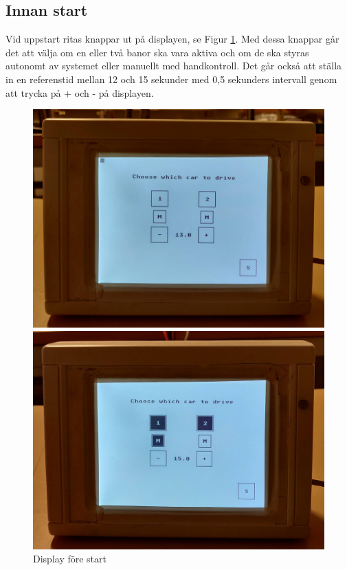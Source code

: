 \subsection{Innan start}

Vid uppstart ritas knappar ut på displayen, se Figur \ref{fig:choose}. Med dessa knappar går
det att välja om en eller två banor ska vara aktiva och om de ska styras
autonomt av systemet eller manuellt med handkontroll. Det går också att ställa
in en referenstid mellan 12 och 15 sekunder med 0,5 sekunders intervall genom
att trycka på + och - på displayen. 
\begin{figure}
	\centering
	\includegraphics[width=0.75\linewidth] {Figures/choose1}

	\vspace*{2\floatsep}%

	\centering
	\includegraphics [width=0.75\linewidth] {Figures/choose2}
	\caption{Display före start}
	\label{fig:choose}
\end{figure}
